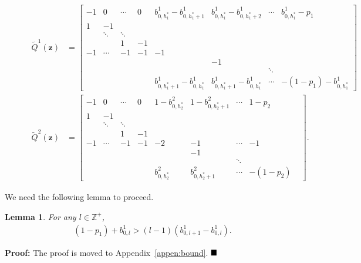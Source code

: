 \documentclass[11pt,twocolumn]{IEEEtran}
\newtheorem{lemma}{Lemma}
\begin{document}
\begin{figure*}[hb]
\hrulefill
\begin{align}
\tilde{Q}^1(\bm z)&=\begin{bmatrix}
-1&0&\cdots& 0 & b^1_{0,h^*_1}-b^1_{0,h^*_1+1} & b^1_{0,h^*_1}-b^1_{0,h^*_1+2}  & \cdots& b^1_{0,h^*_1}-p_1 \\
1&-1& & & & & &\\
& \ddots & \ddots & & & & &\\
& &              1  & -1 & & & & \\
-1& \cdots     &    -1   & -1 & -1 & & &\\
& &                & &  & -1 & & \\
& &                & & & & \ddots &\\
& & &  & b^1_{0,h^*_1+1}-b^1_{0,h^*_1} & b^1_{0,h^*_1+1}-b^1_{0,h^*_1} & \cdots& -(1-p_1)-b^1_{0,h^*_1}
\end{bmatrix}\label{eq:matrix1}
\end{align}
\begin{align}
\tilde{Q}^2(\bm z)&=\begin{bmatrix}
-1&0&\cdots& 0 & 1{-} b^2_{0,h^*_2}& 1-b^2_{0,h^*_2+1} & \cdots& 1-p_2\\
1&-1& & & & & & &\\
& \ddots & \ddots & & & & &\\
& & 1  & -1 & & & &\\
-1& \cdots     &    -1   & -1 & -2 & -1 & \cdots &-1\\
& & & & &-1 & &\\
& & & & & & \ddots &\\
& & & & b^2_{0,h^*_2} & b^2_{0,h^*_2+1} & \cdots& -(1-p_2)
\end{bmatrix}.\label{eq:matrix2}
\end{align}
\vspace{-0.2in}
\end{figure*}

We need the following lemma to proceed.
\begin{lemma}
\label{lemma:bound}
For any $l \in \mathbb{Z}^+$,
\begin{align}
\nonumber
(1-p_1)+b^1_{0,l} > (l-1)(b^1_{0,l+1}-b^1_{0,l}).
\end{align}
\end{lemma}

\noindent \textbf{Proof:}
The proof is moved to Appendix~\ref{appen:bound}. $\hfill \blacksquare$
\vspace{3pt}
\end{document}
